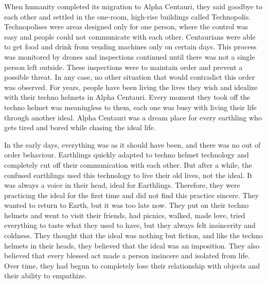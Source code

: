 \documentclass[]{book}
\begin{document}
When humanity completed its migration to Alpha Centauri, they said goodbye to each other and settled in the one-room, high-rise buildings called Technopolis. Technopolises were areas designed only for one person, where the control was easy and people could not communicate with each other. Centaurians were able to get food and drink from vending machines only on certain days. This process was monitored by drones and inspections continued until there was not a single person left outside. These inspections were to maintain order and prevent a possible threat. In any case, no other situation that would contradict this order was observed. For years, people have been living the lives they wish and idealize with their techno helmets in Alpha Centauri. Every moment they took off the techno helmet was meaningless to them, each one was busy with living their life through another ideal. Alpha Centauri was a dream place for every earthling who gets tired and bored while chasing the ideal life.

In the early days, everything was as it should have been, and there was no out of order behaviour. Earthlings quickly adapted to techno helmet technology and completely cut off their communication with each other. But after a while, the confused earthlings used this technology to live their old lives, not the ideal. It was always a voice in their head, ideal for Earthlings. Therefore, they were practicing the ideal for the first time and did not find this practice sincere. They wanted to return to Earth, but it was too late now. They put on their techno helmets and went to visit their friends, had picnics, walked, made love, tried everything to taste what they used to have, but they always felt insincerity and coldness. They thought that the ideal was nothing but fiction, and like the techno helmets in their heads, they believed that the ideal was an imposition. They also believed that every blessed act made a person insincere and isolated from life. Over time, they had begun to completely lose their relationship with objects and their ability to empathize.
\end{document}
